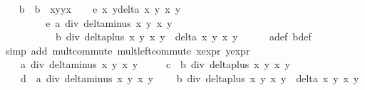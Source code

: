 \begin{isabellebody}
\ \ \isamarkupfalse%
\ b\ \ {\isachardoublequoteopen}b\ {\isacharequal}\ x{}{\isacharasterisk}y{}{\isacharplus}y{}{\isacharasterisk}x{}{\isachardoublequoteclose}\isanewline
\isanewline
\ \ \isamarkupfalse%
\ {\isachardoublequoteopen}{\isacharparenleft}e\ x{}\ y{}{\isacharparenright}{\isacharasterisk}{\isacharparenleft}delta\ x{}\ y{}\ x{}\ y{}{\isacharparenright}\ {\isacharequal}\isanewline
\ \ \ \ \ \ \ \ \ e\ {\isacharparenleft}a\ div\ {\isacharparenleft}delta{\isacharunderscore}minus\ x{}\ y{}\ x{}\ y{}{\isacharparenright}{\isacharparenright}\isanewline
\ \ \ \ \ \ \ \ \ \ \ {\isacharparenleft}b\ div\ {\isacharparenleft}delta{\isacharunderscore}plus\ x{}\ y{}\ x{}\ y{}{\isacharparenright}{\isacharparenright}\ {\isacharasterisk}\ {\isacharparenleft}delta\ x{}\ y{}\ x{}\ y{}{\isacharparenright}\isanewline
\ \ \ \ \isamarkupfalse%
\ a{\isacharunderscore}def\ b{\isacharunderscore}def\isanewline
\ \ \ \ \isamarkupfalse%
\ {\isacharparenleft}simp\ add{\isacharcolon}\ mult{\isachardot}commute\ mult{\isachardot}left{\isacharunderscore}commute\ x{}{\isacharunderscore}expr\ y{}{\isacharunderscore}expr{\isacharparenright}\isanewline
\ \ \isamarkupfalse%
\ \isamarkupfalse%
\ {\isachardoublequoteopen}{\isachardot}{\isachardot}{\isachardot}\ {\isacharequal}\ \isanewline
\ \ \ \ {\isacharparenleft}{\isacharparenleft}a\ div\ delta{\isacharunderscore}minus\ x{}\ y{}\ x{}\ y{}{\isacharparenright}\ {\isacharplus}\isanewline
\ \ \ \ c\ {\isacharasterisk}\ {\isacharparenleft}b\ div\ delta{\isacharunderscore}plus\ x{}\ y{}\ x{}\ y{}{\isacharparenright}\ {\isacharminus}\isanewline
\ \ \ \ {}\ {\isacharminus}\isanewline
\ \ \ \ d\ {\isacharasterisk}\ {\isacharparenleft}a\ div\ delta{\isacharunderscore}minus\ x{}\ y{}\ x{}\ y{}{\isacharparenright}\ {\isacharasterisk}\isanewline
\ \ \ {\isacharparenleft}b\ div\ delta{\isacharunderscore}plus\ x{}\ y{}\ x{}\ y{}{\isacharparenright}\ {\isacharasterisk}\ {\isacharparenleft}delta\ x{}\ y{}\ x{}\ y{}{\isacharparenright}\isanewline

\end{isabellebody}
